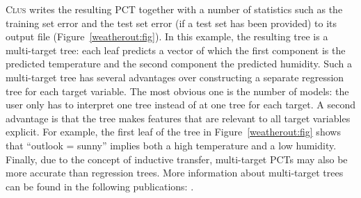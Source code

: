 \documentclass[a4paper]{report}
\newcommand{\clus}{\textsc{Clus}}
\begin{document}
\clus{} writes the resulting PCT together with a number of statistics such as the training set error and the test set error (if a test set has been provided) to its output file (Figure~\ref{weatherout:fig}).  In this example, the resulting tree is a multi-target tree: each leaf predicts a vector of which the first component is the predicted temperature and the second component the predicted humidity. Such a multi-target tree has several advantages over constructing a separate regression tree for each target variable. The most obvious one is the number of models: the user only has to interpret one tree instead of at one tree for each target. A second advantage is that the tree makes features that are relevant to all target variables explicit. For example, the first leaf of the tree in Figure~\ref{weatherout:fig} shows that ``outlook = sunny'' implies both a high temperature and a low humidity. Finally, due to the concept of inductive transfer, multi-target PCTs may also be more accurate than regression trees. More information about multi-target trees can be found in the following publications: \cite{Blockeel1998icml, Blockeel99:proc, Struyf06-KDID:proc, Piccart08-DS-:proc}.
\end{document}
